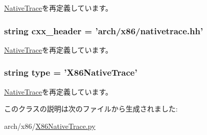 \hyperlink{classNativeTrace_1_1NativeTrace_a58cd55cd4023648e138237cfc0822ae3}{NativeTrace}を再定義しています。\hypertarget{classX86NativeTrace_1_1X86NativeTrace_a17da7064bc5c518791f0c891eff05fda}{
\subsubsection[{cxx\_\-header}]{\setlength{\rightskip}{0pt plus 5cm}string {\bf cxx\_\-header} = 'arch/x86/nativetrace.hh'}}
\label{classX86NativeTrace_1_1X86NativeTrace_a17da7064bc5c518791f0c891eff05fda}


\hyperlink{classNativeTrace_1_1NativeTrace_a17da7064bc5c518791f0c891eff05fda}{NativeTrace}を再定義しています。\hypertarget{classX86NativeTrace_1_1X86NativeTrace_acce15679d830831b0bbe8ebc2a60b2ca}{
\subsubsection[{type}]{\setlength{\rightskip}{0pt plus 5cm}string {\bf type} = '{\bf X86NativeTrace}'}}
\label{classX86NativeTrace_1_1X86NativeTrace_acce15679d830831b0bbe8ebc2a60b2ca}


\hyperlink{classNativeTrace_1_1NativeTrace_acce15679d830831b0bbe8ebc2a60b2ca}{NativeTrace}を再定義しています。

このクラスの説明は次のファイルから生成されました:\begin{DoxyCompactItemize}
\item 
arch/x86/\hyperlink{X86NativeTrace_8py}{X86NativeTrace.py}\end{DoxyCompactItemize}
